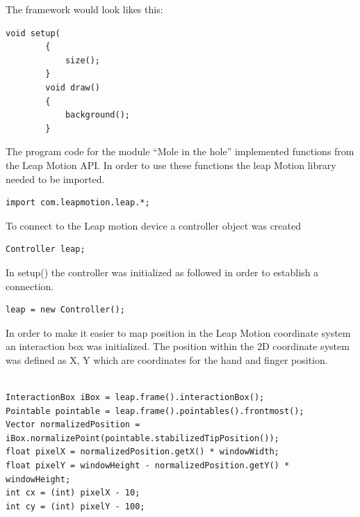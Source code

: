 The framework would look likes this:
\lstset{frameround=tttt}
\lstset{frame=single}
\lstset{xleftmargin=.05\textwidth, xrightmargin=.05\textwidth}
\lstset{language=Java}
\begin{lstlisting}[caption = {Processing framework}, label={lst:Java}]
        void setup(
        {
            size();
        }
        void draw()
        {
            background();
        }

\end{lstlisting}

The program code for the module “Mole in the hole” implemented functions from the Leap Motion API. In order to use these functions the leap Motion library needed to be imported.

\lstset{language=Java}
\begin{lstlisting}[caption = {Leap Motion library}, label={lst:Java}]
import com.leapmotion.leap.*;
\end{lstlisting}

To connect to the Leap motion device a controller object was created

\lstset{language=Java}
\begin{lstlisting}[caption = {The code for touch zone}, label={lst:Java}]
Controller leap;
\end{lstlisting}

In setup() the controller was initialized as followed in order to establish a connection.

\lstset{language=Java}
\begin{lstlisting}[caption = {The code for touch zone}, label={lst:Java}]
leap = new Controller();
\end{lstlisting}

In order to make it easier to map position in the Leap Motion coordinate system an interaction box was initialized. The position within the 2D coordinate system was defined as X, Y which are coordinates for the hand and finger position. 

\lstset{language=Java}
\begin{lstlisting}[caption = {The code for touch zone}, label={lst:Java}]

InteractionBox iBox = leap.frame().interactionBox();
Pointable pointable = leap.frame().pointables().frontmost();
Vector normalizedPosition = iBox.normalizePoint(pointable.stabilizedTipPosition());
float pixelX = normalizedPosition.getX() * windowWidth;
float pixelY = windowHeight - normalizedPosition.getY() * windowHeight;
int cx = (int) pixelX - 10;
int cy = (int) pixelY - 100;

\end{lstlisting}

